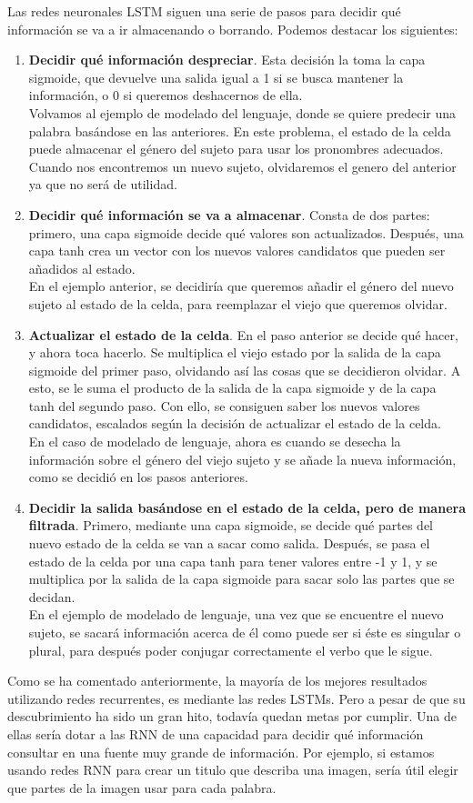 Las redes neuronales LSTM siguen una serie de pasos para decidir qué información se va a ir almacenando o borrando. Podemos destacar los siguientes:
\begin{enumerate}
\item \textbf{Decidir qué información despreciar}. Esta decisión la toma la capa sigmoide, que devuelve una salida igual a 1 si se busca mantener la información, o 0 si queremos deshacernos de ella.\\
Volvamos al ejemplo de modelado del lenguaje, donde se quiere predecir una palabra basándose en las anteriores. En este problema, el estado de la celda puede almacenar el género del sujeto para usar los pronombres adecuados. Cuando nos encontremos un nuevo sujeto, olvidaremos el genero del anterior ya que no será de utilidad.
\item \textbf{Decidir qué información se va a almacenar}. Consta de dos partes: primero, una capa sigmoide decide qué valores son actualizados. Después, una capa tanh crea un vector con los nuevos valores candidatos que pueden ser añadidos al estado.\\
En el ejemplo anterior, se decidiría que queremos añadir el género del nuevo sujeto al estado de la celda, para reemplazar el viejo que queremos olvidar.
\item \textbf{Actualizar el estado de la celda}. En el paso anterior se decide qué hacer, y ahora toca hacerlo. Se multiplica el viejo estado por la salida de la capa sigmoide del primer paso, olvidando así las cosas que se decidieron olvidar. A esto, se le suma el producto de la salida de la capa sigmoide y de la capa tanh del segundo paso. Con ello, se consiguen saber los nuevos valores candidatos, escalados según la decisión de actualizar el estado de la celda.\\
En el caso de modelado de lenguaje, ahora es cuando se desecha la información sobre el género del viejo sujeto y se añade la nueva información, como se decidió en los pasos anteriores.
\item \textbf{Decidir la salida basándose en el estado de la celda, pero de manera filtrada}. Primero, mediante una capa sigmoide, se decide qué partes del nuevo estado de la celda se van a sacar como salida. Después, se pasa el estado de la celda por una capa tanh para tener valores entre -1 y 1, y se multiplica por la salida de la capa sigmoide para sacar solo las partes que se decidan.\\
En el ejemplo de modelado de lenguaje, una vez que se encuentre el nuevo sujeto, se sacará información acerca de él como puede ser si éste es singular o plural, para después poder conjugar correctamente el verbo que le sigue.
\end{enumerate}
Como se ha comentado anteriormente, la mayoría de los mejores resultados utilizando redes recurrentes, es mediante las redes LSTMs. Pero a pesar de que su descubrimiento ha sido un gran hito, todavía quedan metas por cumplir. Una de ellas sería dotar a las RNN de una capacidad para decidir qué información consultar en una fuente muy grande de información. Por ejemplo, si estamos usando redes RNN para crear un titulo que describa una imagen, sería útil elegir que partes de la imagen usar para cada palabra.
\label{ch:teoria}
